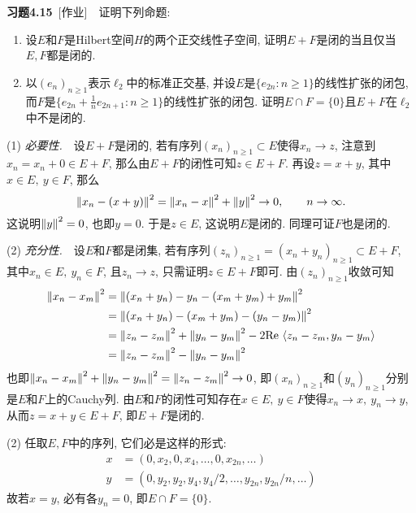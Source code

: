     \textbf{习题4.15}\ [作业]\ \ 证明下列命题:
    \begin{enumerate}[(1)]
    \item 设$ E $和$ F $是Hilbert空间$ H $的两个正交线性子空间, 证明$ E+F $是闭的当且仅当$ E, F $都是闭的.
    \item 以$ (e_n)_{n\geqslant 1} $表示$ \ell_2 $中的标准正交基, 并设$ E $是$ \{ e_{2n} : n\geqslant 1 \} $的线性扩张的闭包, 而$ F $是$ \{ e_{2n}+\frac{1}{n}e_{2n+1} : n\geqslant 1 \} $的线性扩张的闭包. 证明$ E\cap F=\{0\} $且$ E+F $在$ \ell_2 $中不是闭的.
    \end{enumerate}
    \begin{Proof}
    (1) \textsl{必要性.}\ \ 设$ E+F $是闭的, 若有序列$ (x_n)_{n\geqslant 1}\subset E $使得$ x_n\to z $, 注意到$ x_n=x_n+0\in E+F $, 那么由$ E+F $的闭性可知$ z\in E+F $. 再设$ z=x+y $, 其中$ x\in E,\ y\in F $, 那么
    \[
    \left\| x_{n}-(x+y) \right\|^2=\left\| x_{n}-x \right\|^2+\left\| y \right\|^2\to 0,\qquad n\to\infty.
    \]
    这说明$ \left\| y \right\|^2=0 $, 也即$ y=0 $. 于是$ z\in E $, 这说明$ E $是闭的. 同理可证$ F $也是闭的.

    (2) \textsl{充分性.}\ \ 设$ E $和$ F $都是闭集, 若有序列$ (z_n)_{n\geqslant 1}=(x_{n}+y_{n})_{n\geqslant1}\subset E+F $, 其中$ x_n\in E,\ y_n\in F $, 且$ z_n\to z $, 只需证明$ z\in E+F $即可. 由$ (z_n)_{n\geqslant 1} $收敛可知
    \[
    \begin{aligned}
    \left\| x_n-x_m \right\|^2&=\left\| (x_n+y_n)-y_n-(x_m+y_m)+y_m \right\|^2\\
    &=\left\| (x_n+y_n)-(x_m+y_m)-(y_n-y_m) \right\|^2\\
    &=\left\| z_n-z_m \right\|^2+\left\| y_n-y_m \right\|^2-2\mathrm{Re\,}\left\langle z_n-z_m,y_n-y_m \right\rangle\\
    &=\left\| z_n-z_m \right\|^2-\left\| y_n-y_m \right\|^2
    \end{aligned}
    \]
    也即$ \left\| x_n-x_m \right\|^2+\left\| y_n-y_m \right\|^2=\left\| z_n-z_m \right\|^2\to 0 $, 即$ (x_n)_{n\geqslant 1} $和$ (y_n)_{n\geqslant 1} $分别是$ E $和$ F $上的Cauchy列. 由$ E $和$ F $的闭性可知存在$ x\in E,\ y\in F $使得$ x_n\to x,\ y_n\to y $, 从而$ z=x+y\in E+F $, 即$ E+F $是闭的.

    (2) 任取$ E, F $中的序列, 它们必是这样的形式:
    \[
    \begin{aligned}
    x & = (0,x_2,0,x_4,\dots,0,x_{2n},\dots)\\
    y & = (0,y_2,y_2,y_4,y_4/2,\dots,y_{2n},y_{2n}/n,\dots)
    \end{aligned}
    \]
    故若$ x=y $, 必有各$ y_n=0 $, 即$ E\cap F=\{0\} $.


\end{Proof}
